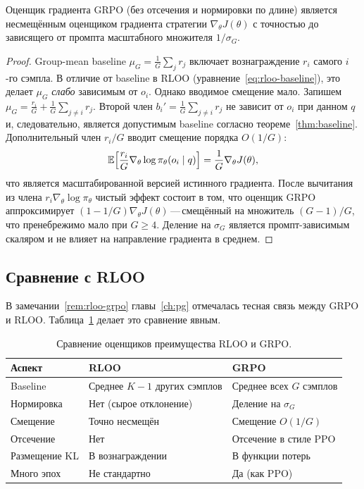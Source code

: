 \begin{theorem}
\label{thm:grpo-unbiased}
Оценщик градиента GRPO (без отсечения и нормировки по длине) является несмещённым оценщиком градиента стратегии $\nabla_\theta J(\theta)$ с точностью до зависящего от промпта масштабного множителя $1/\sigma_G$.
\end{theorem}

\begin{proof}
Group-mean baseline $\mu_G = \frac{1}{G}\sum_j r_j$ включает вознаграждение $r_i$ самого $i$-го сэмпла. В отличие от baseline в RLOO (уравнение~\eqref{eq:rloo-baseline}), это делает $\mu_G$ \emph{слабо} зависимым от $o_i$. Однако вводимое смещение мало. Запишем $\mu_G = \frac{r_i}{G} + \frac{1}{G}\sum_{j \neq i} r_j$. Второй член $b_i' = \frac{1}{G}\sum_{j \neq i} r_j$ не зависит от $o_i$ при данном $q$ и, следовательно, является допустимым baseline согласно теореме~\ref{thm:baseline}. Дополнительный член $r_i / G$ вводит смещение порядка $O(1/G)$:
\[
\operatorname{\mathbb{E}}\!\left[\frac{r_i}{G} \nabla_\theta \log \pi_\theta(o_i \mid q)\right] = \frac{1}{G}\nabla_\theta J(\theta),
\]
что является масштабированной версией истинного градиента. После вычитания из члена $r_i \nabla_\theta \log \pi_\theta$ чистый эффект состоит в том, что оценщик GRPO аппроксимирует $(1 - 1/G)\nabla_\theta J(\theta)$\,---\,смещённый на множитель $(G-1)/G$, что пренебрежимо мало при $G \geq 4$. Деление на $\sigma_G$ является промпт-зависимым скаляром и не влияет на направление градиента в среднем.
\end{proof}

\subsection{Сравнение с RLOO}

В замечании~\ref{rem:rloo-grpo} главы~\ref{ch:pg} отмечалась тесная связь между GRPO и RLOO. Таблица~\ref{tab:grpo-vs-rloo} делает это сравнение явным.

\begin{table}[ht]
\centering
\caption{Сравнение оценщиков преимущества RLOO и GRPO.}
\label{tab:grpo-vs-rloo}
\footnotesize
\begin{tabular}{@{}lll@{}}
\toprule
\textbf{Аспект} & \textbf{RLOO} & \textbf{GRPO} \\
\midrule
Baseline & Среднее $K-1$ других сэмплов & Среднее всех $G$ сэмплов \\
Нормировка & Нет (сырое отклонение) & Деление на $\sigma_G$ \\
Смещение & Точно несмещён & Смещение $O(1/G)$ \\
Отсечение & Нет & Отсечение в стиле PPO \\
Размещение KL & В вознаграждении & В функции потерь \\
Много эпох & Не стандартно & Да (как PPO) \\
\bottomrule
\end{tabular}
\end{table}

